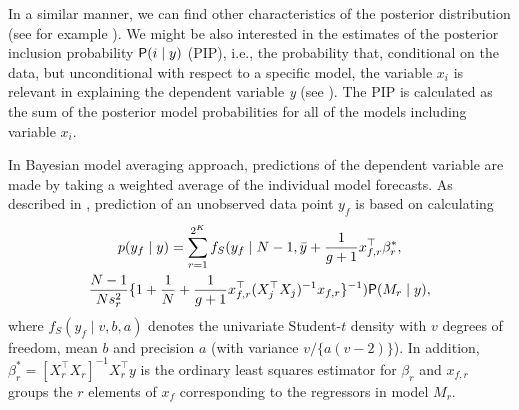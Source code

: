 In a similar manner, we can find other characteristics of the
posterior distribution (see for example \citealt[p.~266]{Koop2003}).
We might be also interested in the estimates of the posterior
inclusion probability $\mathsf{P}(i \mid y)$ (PIP), i.e., the probability
that, conditional on the data, but unconditional with respect to a
specific model, the variable $x_i$ is relevant in explaining the
dependent variable \textit{y} (see \citealt{Leamer1978,
	Mitchell_Beauchamp_1988,DoppelhoferWeeks2009}).  The PIP is
calculated as the sum of the posterior model probabilities for all of
the models including variable $x_i$.

In Bayesian model averaging approach, predictions of the dependent
variable are made by taking a weighted average of the individual model
forecasts. As described in \cite{FernandezLeySteel2001b}, prediction
of an unobserved data point $y_f$ is based on calculating
\begin{multline}
	p(y_f\mid y) = \sum_{r=1}^{2^K} f_S ( y_f \mid N-1,\bar y + \frac{1}{g+1}x^\top_{f,r}\beta^*_r,\\
	\frac{N-1}{Ns^2_r} \{1+\frac{1}{N}+\frac{1}{g+1}x^\top_{f,r}(X^\top_jX_j)^{-1}x_{f,r}\}^{-1})\mathsf{P}(M_r\mid y),    
	\label{eq:predictive_pdf}
\end{multline}
where $f_S ( y_f \mid v, b, a)$ denotes the univariate Student-$t$
density with $v$ degrees of freedom, mean $b$ and precision $a$ (with
variance $ v/ \{a(v-2)\}$).  In addition,
$\beta^*_r=\left [X^\top_rX_r \right ]^{-1}X^\top_ry$ is the ordinary
least squares estimator for $\beta_r$ and $x_{f,r}$ groups the $r$
elements of $x_{f}$ corresponding to the regressors in model $M_r$. 
